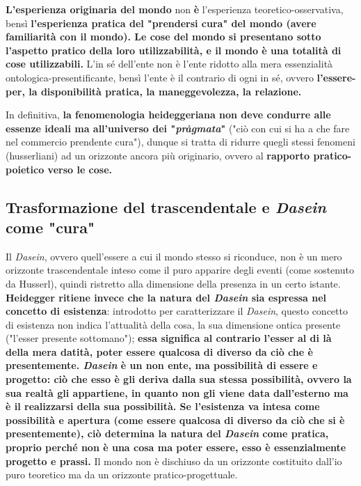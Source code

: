 \textbf{L'esperienza originaria del mondo} non \textbf{è} l'esperienza
teoretico-osservativa, bensì \textbf{l'esperienza pratica del
"prendersi cura" del mondo (avere familiarità con il mondo).
Le cose del mondo si presentano sotto l'aspetto
pratico della loro utilizzabilità, e il mondo è
una totalità di cose utilizzabili.}
L'in sé dell'ente non è l'ente ridotto alla mera
essenzialità ontologica-presentificante, bensì l'ente è il
contrario di ogni in sé, ovvero \textbf{l'essere-per, la
disponibilità pratica, la maneggevolezza, la relazione.}

In definitiva,\textbf{ la fenomenologia heideggeriana non deve
condurre alle essenze ideali ma all'universo dei
"\textit{\textit{pràgmata}}"} ("ciò con cui si ha a che fare nel commercio
prendente cura"), dunque si tratta di ridurre
quegli stessi fenomeni (husserliani) ad un
orizzonte ancora più originario, ovvero al
\textbf{rapporto pratico-poietico verso le cose.}

\subsection{Trasformazione del trascendentale e \textit{Dasein} come "cura"}

Il \textit{Dasein}, ovvero quell'essere a cui il mondo stesso si
riconduce, non è un mero orizzonte trascendentale
inteso come il puro apparire degli eventi (come sostenuto da
Husserl), quindi ristretto alla dimensione
della presenza in un certo istante.
\textbf{Heidegger ritiene invece che la natura del \textit{Dasein} sia
espressa nel concetto di esistenza}: introdotto per caratterizzare il \textit{Dasein}, questo concetto
di esistenza non
indica l'attualità della cosa, la sua dimensione ontica
presente ("l'esser presente sottomano"); \textbf{essa significa
al contrario l'esser al di là della mera datità, poter
essere qualcosa di diverso da ciò che è presentemente.
\textit{Dasein} è un non ente, ma possibilità di essere e
progetto: ciò che esso è gli deriva dalla sua stessa
possibilità, ovvero la sua realtà gli appartiene,
in quanto non gli viene data dall'esterno ma è
il realizzarsi della sua possibilità.
Se l'esistenza va intesa come possibilità e apertura (come essere qualcosa di diverso da ciò che si è presentemente),
ciò determina la natura del \textit{Dasein} come pratica,
proprio perché non è una cosa ma poter essere,
esso è essenzialmente progetto e prassi.}
Il mondo non è dischiuso da un orizzonte costituito
dall'io puro teoretico ma da un orizzonte pratico-progettuale.

